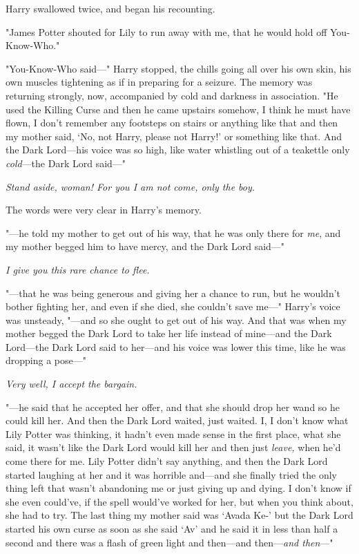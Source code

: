 Harry swallowed twice, and began his recounting.

"James Potter shouted for Lily to run away with me, that he would hold off
You-Know-Who."

"You-Know-Who said\mbox{---}" Harry stopped, the chills going all over his own skin,
his own muscles tightening as if in preparing for a seizure. The memory was
returning strongly, now, accompanied by cold and darkness in association. "He
used{\el} the Killing Curse{\el} and then he came upstairs somehow, I
think he must have flown, I don't remember any footsteps on stairs or anything
like that{\el} and then my mother said, `No, not Harry, please not Harry!'
or something like that. And the Dark Lord---his voice was so high, like water
whistling out of a teakettle only \emph{cold}---the Dark Lord said\mbox{---}"

\emph{Stand aside, woman! For you I am not come, only the boy.}

The words were very clear in Harry's memory.

"---he told my mother to get out of his way, that he was only there for
\emph{me}, and my mother begged him to have mercy, and the Dark Lord said\mbox{---}"

\emph{I give you this rare chance to flee.}

"---that he was being generous and giving her a chance to run, but he wouldn't
bother fighting her, and even if she died, she couldn't save me\mbox{---}" Harry's
voice was unsteady, "---and so she ought to get out of his way. And that was
when my mother begged the Dark Lord to take her life instead of mine---and the
Dark Lord---the Dark Lord said to her---and his voice was lower this time, like
he was dropping a pose\mbox{---}"

\emph{Very well, I accept the bargain.}

"---he said that he accepted her offer, and that she should drop her wand so he
could kill her. And then the Dark Lord waited, just waited. I, I don't know
what Lily Potter was thinking, it hadn't even made sense in the first place,
what she said, it wasn't like the Dark Lord would kill her and then just
\emph{leave,} when he'd come there for me. Lily Potter didn't say anything, and
then the Dark Lord started laughing at her and it was horrible and---and she
finally tried the only thing left that wasn't abandoning me or just giving up
and dying. I don't know if she even could've, if the spell would've worked for
her, but when you think about, she had to try. The last thing my mother said
was `Avada Ke-' but the Dark Lord started his own curse as soon as she said
`Av' and he said it in less than half a second and there was a flash of green
light and then---and then---\emph{and then}\mbox{---}"

